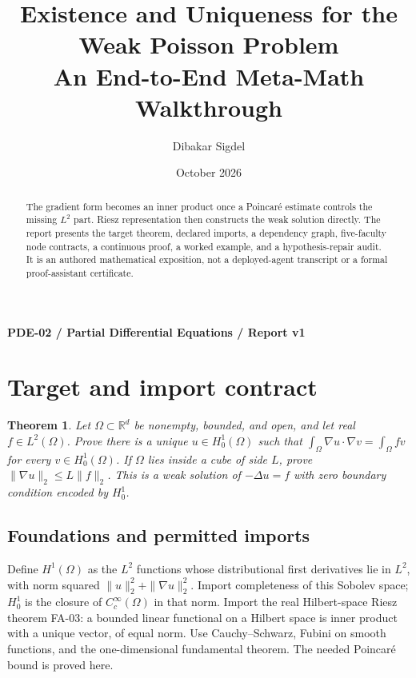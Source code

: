 \documentclass[preprint,12pt,aps,pra,showkeys,amsmath,amssymb,superscriptaddress,floatfix]{revtex4-2}
\newtheorem{theorem}{Theorem}[section]
\theoremstyle{definition}
\theoremstyle{remark}
\begin{document}
\title{Existence and Uniqueness for the Weak Poisson Problem\\[4pt]\large An End-to-End Meta-Math Walkthrough}

\author{Dibakar Sigdel}


\date{October 2026}

\begin{abstract}

The gradient form becomes an inner product once a Poincaré estimate
controls the missing \(L^2\) part. Riesz representation then constructs
the weak solution directly. The report presents the target theorem,
declared imports, a dependency graph, five-faculty node contracts, a
continuous proof, a worked example, and a hypothesis-repair audit. It is
an authored mathematical exposition, not a deployed-agent transcript or
a formal proof-assistant certificate.

\end{abstract}\maketitle\linespread{1.12}\selectfont

\noindent\textbf{PDE-02 / Partial Differential Equations / Report v1}

\section{Target and import contract}

\begin{theorem}

Let \(\Omega\subset\mathbb R^d\) be nonempty, bounded, and open, and let
real \(f\in L^2(\Omega)\). Prove there is a unique
\(u\in H_0^1(\Omega)\) such that
\(\int_\Omega\nabla u\cdot\nabla v=\int_\Omega fv\) for every
\(v\in H_0^1(\Omega)\). If \(\Omega\) lies inside a cube of side \(L\),
prove \(\|\nabla u\|_2\le L\|f\|_2\). This is a weak solution of
\(-\Delta u=f\) with zero boundary condition encoded by \(H_0^1\).

\end{theorem}

\subsection{Foundations and permitted imports}

Define \(H^1(\Omega)\) as the \(L^2\) functions whose distributional
first derivatives lie in \(L^2\), with norm squared
\(\|u\|_2^2+\|\nabla u\|_2^2\). Import completeness of this Sobolev
space; \(H_0^1\) is the closure of \(C_c^\infty(\Omega)\) in that norm.
Import the real Hilbert-space Riesz theorem FA-03: a bounded linear
functional on a Hilbert space is inner product with a unique vector, of
equal norm. Use Cauchy--Schwarz, Fubini on smooth functions, and the
one-dimensional fundamental theorem. The needed Poincaré bound is proved
here.
\end{document}
